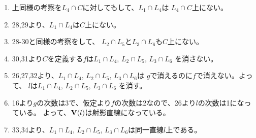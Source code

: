 \begin{myproof}
\begin{enumerate}
    \item
    上同様の考察を$L_4\cap C$に対してもして、$L_1 \cap L_4$は
    $L_4\cap C$上にない。
    \item
    28,29より、$L_1\cap L_4$は$C$上にない。
    \item
    28-30と同様の考察をして、
    $L_2\cap L_5$と$L_3\cap L_6$も$C$上にない。
    \item
    30,31より$C$を定義する$f$は$L_1\cap L_4,\, L_2\cap L_5,\, L_3\cap L_6$
    を消さない。
    \item
    26,27,32より、$L_1\cap L_4,\, L_2 \cap L_5,\, L_3\cap L_6$は
    $g$で消えるのに$f$で消えない。よって、
    $l$は$L_1\cap L_4,\, L_2 \cap L_5,\, L_3\cap L_6$
    を消す。
    \item
    16より$g$の次数は3で、仮定より$f$の次数は2なので、26より$l$の次数は1になっている。
    よって、$\textbf V(l)$は射影直線になっている。
    \item
    33,34より、$L_1\cap L_4,\, L_2\cap L_5,\, L_3\cap L_6$は同一直線$l$上である。
  \end{enumerate}
\end{myproof}

